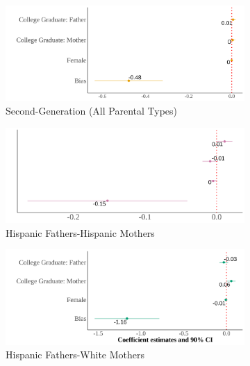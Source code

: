 \documentclass[12pt,english]{article}
\begin{document}
\begin{center}
\begin{figure}[!htb]
\centering
\caption{Relationship Between Self-Reported Hispanic Identity and Bias: By Parental Types}
\label{plot01-regression-byparent}
\begin{subfigure}{.48\textwidth}
\caption{Second-Generation (All Parental Types)}
\centering
\includegraphics[width=.9\linewidth]{figure/by-parents-regs-all.png}
\end{subfigure}
\centering
\begin{subfigure}{.48\textwidth}
\caption{Hispanic Fathers-Hispanic Mothers}
\centering
\includegraphics[width=.9\linewidth]{figure/by-parents-regs-hh.png}
\end{subfigure}
\begin{subfigure}{.48\textwidth}
\caption{Hispanic Fathers-White Mothers}
\centering
\includegraphics[width=.9\linewidth]{figure/by-parents-regs-hw.png}
\end{subfigure}
\begin{subfigure}{.48\textwidth}

\end{subfigure}
\end{figure}
\end{center}
\end{document}
